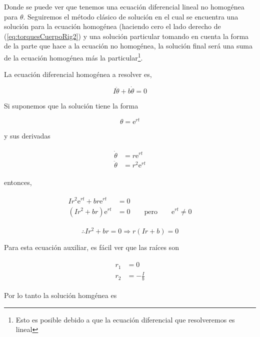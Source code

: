 \documentclass[a4paper,10pt]{article}
\numberwithin{equation}{section}
\newcommand{\euler}{\mathrm{e}}
\begin{document}
Donde se puede ver que tenemos una ecuación diferencial lineal no homogénea
para $\theta$. Seguiremos el método clásico de solución en el cual se encuentra
una solución para la ecuación homogénea (haciendo cero el lado derecho de
(\ref{eq:torquesCuerpoRig2}) y una solución particular tomando en cuenta 
la forma de la parte que hace a la ecuación no homogénea, la solución final 
será una suma de la ecuación homogénea más la particular\footnote{Esto es posible
debido a que la ecuación diferencial que resolveremos es lineal}.

\vspace{.3cm}

La ecuación diferencial homogénea a resolver es,

\begin{equation}
 I\ddot{\theta} + b\dot{\theta} = 0
 \label{eq:helixHomog1}
\end{equation}

Si suponemos que la solución tiene la forma 

$$\theta = \euler^{rt}$$

y sus derivadas

\begin{align*}
 \begin{split}
%  
  \dot{\theta} &= r\euler^{rt} \\
  \ddot{\theta} &= r^2\euler^{rt}  
%
 \end{split}
\end{align*}


entonces,

\begin{align*}
 \begin{split}
%  
  Ir^2\euler^{rt} + br\euler^{rt} &= 0 \\
  (Ir^2+br)\euler^{rt} &= 0 \qquad \text{pero} \qquad \euler^{rt} \neq 0
%
 \end{split}
\end{align*}

$$
\therefore Ir^2 + br = 0 \Rightarrow r(Ir + b) = 0
$$

Para esta ecuación auxiliar, es fácil ver que las raíces son

\begin{align*}
 \begin{split}
  r_1 &= 0 \\
  r_2 &= - \frac{I}{b}
  \label{eq:raicesHelixHomog}
 \end{split}
\end{align*}

Por lo tanto la solución homgénea es
\end{document}
